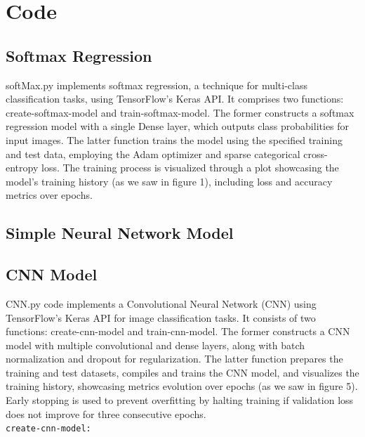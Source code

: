 \documentclass{article}
\newcommand{\code}[1]{\colorbox{light-gray}{\texttt{#1}}}
\begin{document}


\newpage
\section{Code}
\subsection{Softmax Regression}
softMax.py implements softmax regression, a technique for multi-class classification tasks, using TensorFlow's Keras API. It comprises two functions: create-softmax-model and train-softmax-model. The former constructs a softmax regression model with a single Dense layer, which outputs class probabilities for input images. The latter function trains the model using the specified training and test data, employing the Adam optimizer and sparse categorical cross-entropy loss. The training process is visualized through a plot showcasing the model's training history (as we saw in figure 1), including loss and accuracy metrics over epochs.



\newpage
\subsection{Simple Neural Network Model}

\newpage
\subsection{CNN Model}
CNN.py code implements a Convolutional Neural Network (CNN) using TensorFlow's Keras API for image classification tasks. It consists of two functions: create-cnn-model and train-cnn-model. The former constructs a CNN model with multiple convolutional and dense layers, along with batch normalization and dropout for regularization. The latter function prepares the training and test datasets, compiles and trains the CNN model, and visualizes the training history, showcasing metrics evolution over epochs (as we saw in figure 5). Early stopping is used to prevent overfitting by halting training if validation loss does not improve for three consecutive epochs.\\\newline
\code{create-cnn-model:}
\end{document}
